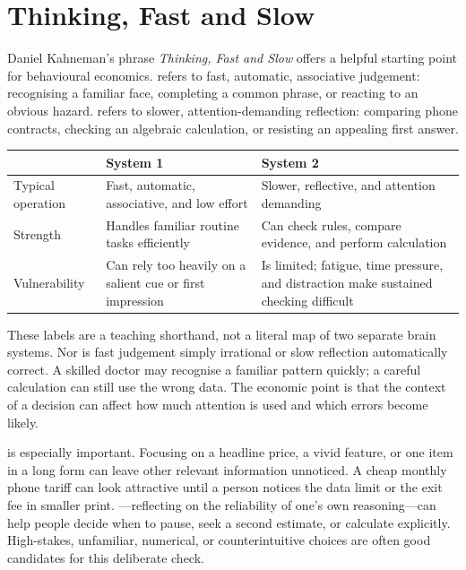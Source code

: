 \section{Thinking, Fast and Slow}

Daniel Kahneman's phrase \emph{Thinking, Fast and Slow} offers a helpful
starting point for behavioural economics.  refers to fast,
automatic, associative judgement: recognising a familiar face, completing a
common phrase, or reacting to an obvious hazard.  refers to
slower, attention-demanding reflection: comparing phone contracts, checking
an algebraic calculation, or resisting an appealing first answer.

\begin{center}
\small
\renewcommand{\arraystretch}{1.18}
\begin{tabular}{@{}p{3.05cm}p{3.55cm}p{3.85cm}@{}}
  \toprule
   & System 1 & System 2\\
  \midrule
  Typical operation & Fast, automatic, associative, and low effort & Slower, reflective, and attention demanding\\
  Strength & Handles familiar routine tasks efficiently & Can check rules, compare evidence, and perform calculation\\
  Vulnerability & Can rely too heavily on a salient cue or first impression & Is limited; fatigue, time pressure, and distraction make sustained checking difficult\\
  \bottomrule
\end{tabular}
\end{center}

These labels are a teaching shorthand, not a literal map of two separate
brain systems. Nor is fast judgement simply irrational or slow reflection
automatically correct. A skilled doctor may recognise a familiar pattern
quickly; a careful calculation can still use the wrong data. The economic
point is that the context of a decision can affect how much attention is used
and which errors become likely.

 is especially important. Focusing on a
headline price, a vivid feature, or one item in a long form can leave other
relevant information unnoticed. A cheap monthly phone tariff can look
attractive until a person notices the data limit or the exit fee in smaller
print. ---reflecting on the reliability of one's own
reasoning---can help people decide when to pause, seek a second estimate, or
calculate explicitly. High-stakes, unfamiliar, numerical, or
counterintuitive choices are often good candidates for this deliberate check.


